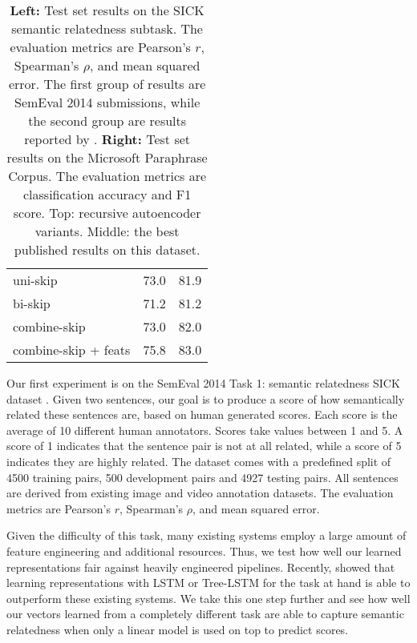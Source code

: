 \documentclass{article} \usepackage{nips15submit_e,times}
\begin{document}
\begin{table}
{\begin{tabular}{lcc}
uni-skip & 73.0 & 81.9  \\
bi-skip & 71.2 & 81.2  \\
combine-skip & 73.0 & 82.0 \\
combine-skip + feats & 75.8 & 83.0  \\ \bottomrule
\end{tabular}
}
\caption{{\bf Left:} Test set results on the SICK semantic relatedness subtask. The evaluation metrics are Pearson's $r$, Spearman's $\rho$, and mean squared error. The first group of results are SemEval 2014 submissions, while the second group are results reported by \cite{tai2015improved}. {\bf Right:} Test set results on the Microsoft Paraphrase Corpus. The evaluation metrics are classification accuracy and F1 score. Top: recursive autoencoder variants. Middle: the best published results on this dataset.}
\label{tab:semanticsim-results}
\end{table}

Our first experiment is on the SemEval 2014 Task 1: semantic relatedness SICK dataset \cite{marelli2014semeval}. Given two sentences, our goal is to produce a score of how semantically related these sentences are, based on human generated scores. Each score is the average of 10 different human annotators. Scores take values between 1 and 5. A score of 1 indicates that the sentence pair is not at all related, while a score of 5 indicates they are highly related. The dataset comes with a predefined split of 4500 training pairs, 500 development pairs and 4927 testing pairs. All sentences are derived from existing image and video annotation datasets. The evaluation metrics are Pearson's $r$, Spearman's $\rho$, and mean squared error.

Given the difficulty of this task, many existing systems employ a large amount of feature engineering and additional resources. Thus, we test how well our learned representations fair against heavily engineered pipelines. Recently, \cite{tai2015improved} showed that learning representations with LSTM or Tree-LSTM for the task at hand is able to outperform these existing systems. We take this one step further and see how well our vectors learned from a completely different task are able to capture semantic relatedness when only a linear model is used on top to predict scores.
\end{document}
